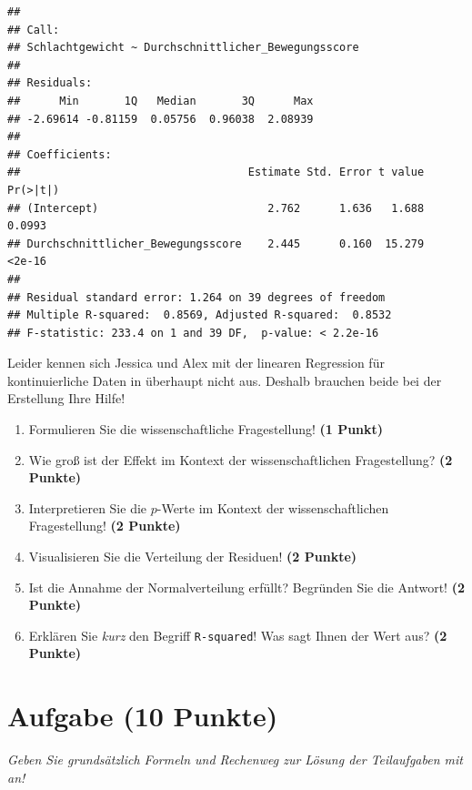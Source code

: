 \documentclass[a4paper, 9pt]{scrartcl}\usepackage[]{graphicx}\usepackage[]{xcolor}
\makeatletter
\newenvironment{kframe}{%
 \def\at@end@of@kframe{}%
 \ifinner\ifhmode%
  \def\at@end@of@kframe{\end{minipage}}%
  \begin{minipage}{\columnwidth}%
 \fi\fi%
 \def\FrameCommand##1{\hskip\@totalleftmargin \hskip-\fboxsep
 \colorbox{shadecolor}{##1}\hskip-\fboxsep
     \hskip-\linewidth \hskip-\@totalleftmargin \hskip\columnwidth}%
 \MakeFramed {\advance\hsize-\width
   \@totalleftmargin\z@ \linewidth\hsize
   \@setminipage}}%
 {\par\unskip\endMakeFramed%
 \at@end@of@kframe}
\newenvironment{knitrout}{}{} %
\makeatother
\begin{document}
\begin{knitrout}
\color{fgcolor}\begin{kframe}
\begin{verbatim}
## 
## Call:
## Schlachtgewicht ~ Durchschnittlicher_Bewegungsscore
## 
## Residuals:
##      Min       1Q   Median       3Q      Max 
## -2.69614 -0.81159  0.05756  0.96038  2.08939 
## 
## Coefficients:
##                                   Estimate Std. Error t value Pr(>|t|)
## (Intercept)                          2.762      1.636   1.688   0.0993
## Durchschnittlicher_Bewegungsscore    2.445      0.160  15.279   <2e-16
## 
## Residual standard error: 1.264 on 39 degrees of freedom
## Multiple R-squared:  0.8569,	Adjusted R-squared:  0.8532 
## F-statistic: 233.4 on 1 and 39 DF,  p-value: < 2.2e-16
\end{verbatim}
\end{kframe}
\end{knitrout}

Leider kennen sich Jessica und Alex mit der linearen Regression für kontinuierliche Daten in \Rlogo überhaupt nicht aus. Deshalb brauchen beide bei der Erstellung Ihre Hilfe!


\begin{enumerate}
\item Formulieren Sie die wissenschaftliche Fragestellung! \textbf{(1 Punkt)}
\item Wie groß ist der Effekt im Kontext der wissenschaftlichen Fragestellung? \textbf{(2 Punkte)} 
\item Interpretieren Sie die $p$-Werte im Kontext der wissenschaftlichen Fragestellung! \textbf{(2 Punkte)}
\item Visualisieren Sie die Verteilung der Residuen! \textbf{(2 Punkte)} 
\item Ist die Annahme der Normalverteilung erfüllt? Begründen Sie die Antwort! \textbf{(2 Punkte)}
\item Erklären Sie \textit{kurz} den Begriff \texttt{R-squared}! Was sagt Ihnen der Wert aus? \textbf{(2 Punkte)}
\end{enumerate}
 
\clearpage

\section{Aufgabe \hfill (10 Punkte)}

\textit{Geben Sie grundsätzlich Formeln und Rechenweg zur Lösung der Teilaufgaben mit an!} \\[1Ex]
 
\end{document}
